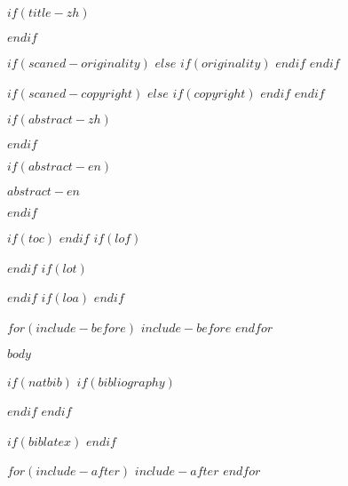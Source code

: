 \documentclass[$for(classoption)$$classoption$$sep$,$endfor$]{sjtuthesis}
\begin{document}

$if(title-zh)$
\maketitle
$endif$

$if(scaned-originality)$
$else$
$if(originality)$
\originalitypage
$endif$
$endif$

$if(scaned-copyright)$
$else$
$if(copyright)$
\copyrightpage
$endif$
$endif$

\frontmatter

$if(abstract-zh)$
\begin{abstract}
$abstract-zh$
\end{abstract}
$endif$

$if(abstract-en)$
\begin{abstract*}
$abstract-en$
\end{abstract*}
$endif$

$if(toc)$
\tableofcontents
$endif$
$if(lof)$
\listoffigures*
$endif$
$if(lot)$
\listoftables*
$endif$
$if(loa)$
\listofalgorithms*
$endif$

$for(include-before)$
$include-before$
$endfor$


\mainmatter

$body$


\backmatter

$if(natbib)$
$if(bibliography)$

$endif$
$endif$

$if(biblatex)$
\printbibliography[heading=bibintoc]
$endif$

$for(include-after)$
$include-after$
$endfor$

\end{document}
